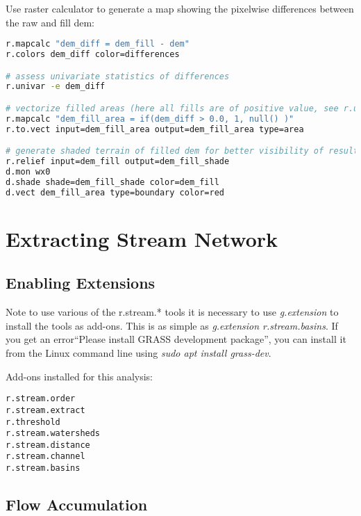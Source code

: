 Use raster calculator to generate a map showing the pixelwise differences between the raw and fill dem:

\begin{lstlisting}[language=bash]
r.mapcalc "dem_diff = dem_fill - dem"
r.colors dem_diff color=differences

# assess univariate statistics of differences
r.univar -e dem_diff

# vectorize filled areas (here all fills are of positive value, see r.univar output)
r.mapcalc "dem_fill_area = if(dem_diff > 0.0, 1, null() )"
r.to.vect input=dem_fill_area output=dem_fill_area type=area

# generate shaded terrain of filled dem for better visibility of results and visualise differences
r.relief input=dem_fill output=dem_fill_shade
d.mon wx0
d.shade shade=dem_fill_shade color=dem_fill
d.vect dem_fill_area type=boundary color=red
\end{lstlisting}

\section{Extracting Stream Network}

\subsection{Enabling Extensions}

Note to use various of the r.stream.* tools it is necessary to use \textit{g.extension} to install the tools as add-ons. This is as simple as \textit{g.extension r.stream.basins}. If you get an error``Please install GRASS development package”, you can install it from the Linux command line using \textit{sudo apt install grass-dev}.

Add-ons installed for this analysis:

\begin{verbatim}
r.stream.order
r.stream.extract
r.threshold
r.stream.watersheds
r.stream.distance
r.stream.channel
r.stream.basins
\end{verbatim}

\subsection{Flow Accumulation}

